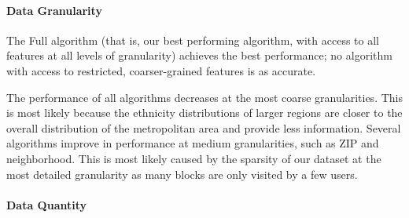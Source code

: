 
\paragraph{Data Granularity}
\label{subsec:inference-granularity}


The Full algorithm (that is, our best performing algorithm, with access to all features at all levels of granularity) achieves the best performance; no algorithm with access to restricted, coarser-grained features is as accurate.

The performance of all algorithms decreases at the most coarse granularities. This is most likely because the ethnicity distributions of larger regions are closer to the overall distribution of the metropolitan area and provide less information. Several algorithms improve in performance at medium granularities, such as ZIP and neighborhood. This is most likely caused by the sparsity of our dataset at the most detailed granularity as many blocks are only visited by a few users.

\paragraph{Data Quantity}

